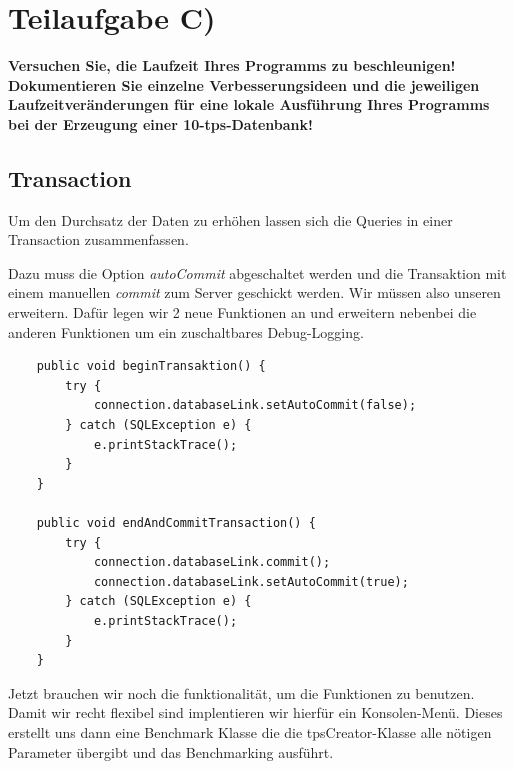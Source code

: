 \section{Teilaufgabe C)}
\textbf{Versuchen Sie, die Laufzeit Ihres Programms zu beschleunigen! Dokumentieren Sie
einzelne Verbesserungsideen und die jeweiligen Laufzeitveränderungen für eine lokale
Ausführung Ihres Programms bei der Erzeugung einer 10-tps-Datenbank!}

\subsection{Transaction}
Um den Durchsatz der Daten zu erhöhen lassen sich die Queries in einer
Transaction zusammenfassen.  

Dazu muss die Option \textit{autoCommit} abgeschaltet werden und die Transaktion
mit einem manuellen \textit{commit} zum Server geschickt werden. Wir müssen also
unseren  erweitern. Dafür legen wir 2 neue Funktionen an und
erweitern nebenbei die anderen Funktionen um ein zuschaltbares Debug-Logging.

\begin{lstlisting}
	public void beginTransaktion() {
		try {
			connection.databaseLink.setAutoCommit(false);
		} catch (SQLException e) {
			e.printStackTrace();
		}
	}
	
	public void endAndCommitTransaction() {
		try {
			connection.databaseLink.commit();
			connection.databaseLink.setAutoCommit(true);
		} catch (SQLException e) {
			e.printStackTrace();
		}
	}
\end{lstlisting}


Jetzt brauchen wir noch die funktionalität, um die Funktionen zu benutzen. Damit
wir recht flexibel sind implentieren wir hierfür ein Konsolen-Menü. Dieses
erstellt uns dann eine Benchmark Klasse die die tpsCreator-Klasse alle nötigen
Parameter übergibt und das Benchmarking ausführt.\\

